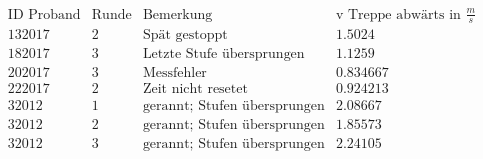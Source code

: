\[\begin{array}{cccc}
 \text{ID Proband} & \text{Runde} & \text{Bemerkung} & \text{v Treppe abw{\" a}rts in }\frac{m}{s}  \\
 132017 & 2 & \text{Sp{\" a}t gestoppt} & 1.5024 \\
 182017 & 3 & \text{Letzte Stufe {\" u}bersprungen} & 1.1259 \\
 202017 & 3 & \text{Messfehler} & 0.834667 \\
 222017 & 2 & \text{Zeit nicht resetet} & 0.924213 \\
 32012 & 1 & \text{gerannt; Stufen {\" u}bersprungen} & 2.08667 \\
 32012 & 2 & \text{gerannt; Stufen {\" u}bersprungen} & 1.85573 \\
 32012 & 3 & \text{gerannt; Stufen {\" u}bersprungen} & 2.24105 \\
\end{array}\]

